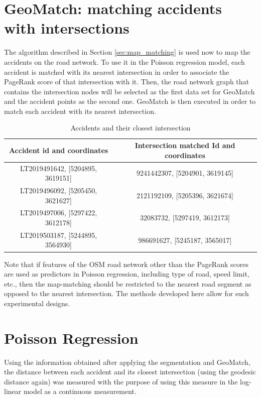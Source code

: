 \section{GeoMatch: matching accidents with intersections}\label{sec:results_geomatch}
The algorithm described in Section \ref{sec:map_matching} is used now to map the accidents on the road network. To use it in the Poisson regression model, each accident is matched with its nearest intersection in order to associate the PageRank score of that intersection with it. Then, the road network graph that contains the intersection nodes will be selected as the first data set for GeoMatch and the accident points as the second one. GeoMatch is then executed in order to match each accident with its nearest intersection.
\begin{table}[H]
\centering
\begin{tabular}{|c|c|}
\hline
\textbf{Accident id and coordinates}         & \textbf{Intersection matched Id and coordinates}  \\ \hline
LT2019491642, [5204895, 3619151]             &  9241442307, [5204901, 3619145]   \\ \hline
LT2019496092, [5205450, 3621627]   &               2121192109, [5205396, 3621674] \\ \hline
LT2019497006, [5297422, 3612178]            &    32083732, [5297419, 3612173]  \\ \hline
LT2019503187, [5244895, 3564930]             &    986691627, [5245187, 3565017] \\ \hline
\end{tabular}
\captionsetup{justification=centering}
\caption{Accidents and their closest intersection}
\label{tab:acc_inters}
\end{table}

Note that if features of the \ac{OSM} road network other than the PageRank scores are used as predictors in Poisson regression, including type of road, speed limit, etc., then the map-matching should be restricted to the nearest road segment as opposed to the nearest intersection. The methods developed here allow for such experimental designs.


\section{Poisson Regression}\label{sec:results_regression}
Using the information obtained after applying the segmentation and GeoMatch, the distance between each accident and its closest intersection (using the geodesic distance again) was measured with the purpose of using this measure in the log-linear model as a continuous measurement. 

